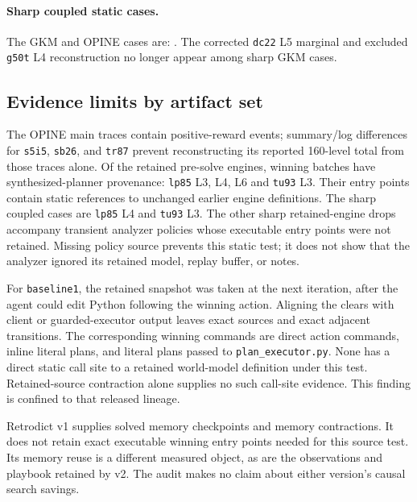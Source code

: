\documentclass[11pt]{article}
\theoremstyle{definition}
\theoremstyle{remark}
\begin{document}
\paragraph{Sharp coupled static cases.}
\begingroup\footnotesize\sloppy
The \GKMCoupledWitnesses{} GKM and \OPINECoupledWitnesses{} OPINE cases are:
\CoupledWitnessEnumeration. The corrected \texttt{dc22} L5 marginal and excluded
\texttt{g50t} L4 reconstruction no longer appear among sharp GKM cases.
\endgroup

\subsection{Evidence limits by artifact set}
The OPINE main traces contain \OPINETraceSolveEvents{} positive-reward events;
summary/log differences for \texttt{s5i5}, \texttt{sb26}, and \texttt{tr87} prevent
reconstructing its reported 160-level total from those traces alone. Of the
\OPINEExactWins{} retained pre-solve engines, \OPINEHardReuse{} winning batches have
synthesized-planner provenance: \texttt{lp85} L3, L4, L6 and \texttt{tu93} L3.
Their entry points contain static references to unchanged earlier engine definitions.
The sharp coupled cases are \texttt{lp85} L4 and \texttt{tu93} L3. The other
\OPINEUncoupledSharp{} sharp retained-engine drops accompany transient analyzer
policies whose executable entry points were not retained. Missing policy source
prevents this static test; it does not show that the analyzer ignored its retained
model, replay buffer, or notes.

For \texttt{baseline1}, the retained snapshot was taken at the next iteration,
after the agent could edit Python following the winning action. Aligning the
\BaselineOneReportedClears{} clears with client or guarded-executor output leaves
\BaselineOneExactWins{} exact sources and \BaselineOneExactAdjacent{} exact adjacent
transitions. The corresponding winning commands are
\BaselineOneDirectLiteralWins{} direct action commands,
\BaselineOneInlineLiteralWins{} inline literal plans, and
\BaselineOneExecutorLiteralWins{} literal plans passed to \texttt{plan\_executor.py}.
None has a direct static call site to a retained world-model definition under this
test. Retained-source contraction alone supplies no such call-site evidence.
This finding is confined to that released lineage.

Retrodict v1 supplies \RetrodictRetainedCheckpoints{} solved memory checkpoints and
\RetrodictMemoryContractions{} memory contractions. It does not retain exact
executable winning entry points needed for this source test. Its memory reuse is a
different measured object, as are the observations and playbook retained by v2.
The audit makes no claim about either version's causal search savings.
\end{document}
